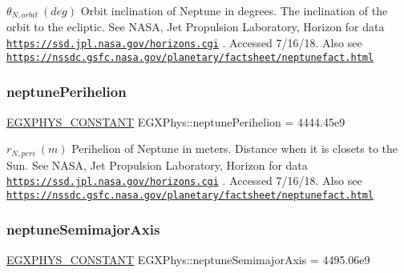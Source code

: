 $ \theta_{N,orbit} \ (deg)$ Orbit inclination of Neptune in degrees. The inclination of the orbit to the ecliptic. See N\+A\+SA, Jet Propulsion Laboratory, Horizon for data \href{https://ssd.jpl.nasa.gov/horizons.cgi}{\tt https\+://ssd.\+jpl.\+nasa.\+gov/horizons.\+cgi} . Accessed 7/16/18. Also see \href{https://nssdc.gsfc.nasa.gov/planetary/factsheet/neptunefact.html}{\tt https\+://nssdc.\+gsfc.\+nasa.\+gov/planetary/factsheet/neptunefact.\+html} \mbox{\label{group___e_g_x_phys-_constants-_astrophysics-_solar_system-_neptune-_orbit_ga17079b562c5aa57a9506bd34c9864b02}} 
\subsubsection{\texorpdfstring{neptune\+Perihelion}{neptunePerihelion}}
{\footnotesize\ttfamily \mbox{\hyperlink{group___e_g_x_phys-_constants-_macros_ga76980d288494ce1714c9ac68a95ba702}{E\+G\+X\+P\+H\+Y\+S\+\_\+\+C\+O\+N\+S\+T\+A\+NT}} E\+G\+X\+Phys\+::neptune\+Perihelion = 4444.\+45e9}

$ r_{N,peri} \ (m)$ Perihelion of Neptune in meters. Distance when it is closets to the Sun. See N\+A\+SA, Jet Propulsion Laboratory, Horizon for data \href{https://ssd.jpl.nasa.gov/horizons.cgi}{\tt https\+://ssd.\+jpl.\+nasa.\+gov/horizons.\+cgi} . Accessed 7/16/18. Also see \href{https://nssdc.gsfc.nasa.gov/planetary/factsheet/neptunefact.html}{\tt https\+://nssdc.\+gsfc.\+nasa.\+gov/planetary/factsheet/neptunefact.\+html} \mbox{\label{group___e_g_x_phys-_constants-_astrophysics-_solar_system-_neptune-_orbit_ga3bf40ceee0e50ac1d2f5c5a56ce9df83}} 
\subsubsection{\texorpdfstring{neptune\+Semimajor\+Axis}{neptuneSemimajorAxis}}
{\footnotesize\ttfamily \mbox{\hyperlink{group___e_g_x_phys-_constants-_macros_ga76980d288494ce1714c9ac68a95ba702}{E\+G\+X\+P\+H\+Y\+S\+\_\+\+C\+O\+N\+S\+T\+A\+NT}} E\+G\+X\+Phys\+::neptune\+Semimajor\+Axis = 4495.\+06e9}

